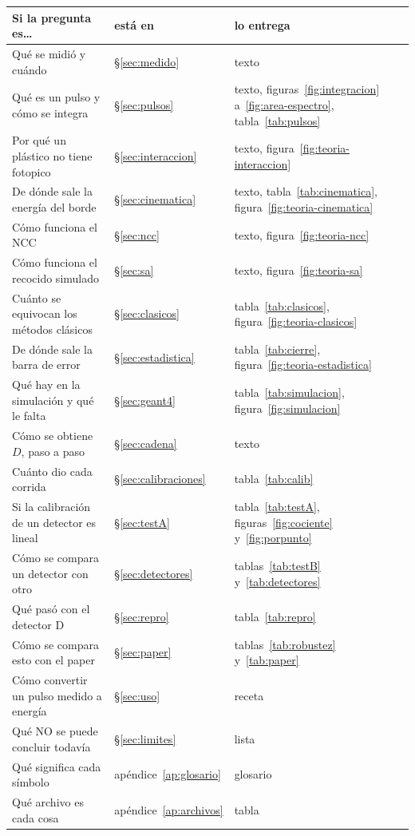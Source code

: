 \documentclass[11pt,a4paper]{article}
\begin{document}
\begin{center}
\begin{tabular}{lll}
\toprule
\textbf{Si la pregunta es\ldots} & \textbf{está en} & \textbf{lo entrega} \\
\midrule
Qué se midió y cuándo & \S\ref{sec:medido} & texto \\
Qué es un pulso y cómo se integra & \S\ref{sec:pulsos} &
   texto, figuras~\ref{fig:integracion} a~\ref{fig:area-espectro},
   tabla~\ref{tab:pulsos} \\
Por qué un plástico no tiene fotopico & \S\ref{sec:interaccion} &
   texto, figura~\ref{fig:teoria-interaccion} \\
De dónde sale la energía del borde & \S\ref{sec:cinematica} &
   texto, tabla~\ref{tab:cinematica}, figura~\ref{fig:teoria-cinematica} \\
Cómo funciona el NCC & \S\ref{sec:ncc} &
   texto, figura~\ref{fig:teoria-ncc} \\
Cómo funciona el recocido simulado & \S\ref{sec:sa} &
   texto, figura~\ref{fig:teoria-sa} \\
Cuánto se equivocan los métodos clásicos & \S\ref{sec:clasicos} &
   tabla~\ref{tab:clasicos}, figura~\ref{fig:teoria-clasicos} \\
De dónde sale la barra de error & \S\ref{sec:estadistica} &
   tabla~\ref{tab:cierre}, figura~\ref{fig:teoria-estadistica} \\
Qué hay en la simulación y qué le falta & \S\ref{sec:geant4} &
   tabla~\ref{tab:simulacion}, figura~\ref{fig:simulacion} \\
Cómo se obtiene $D$, paso a paso & \S\ref{sec:cadena} & texto \\
Cuánto dio cada corrida & \S\ref{sec:calibraciones} & tabla~\ref{tab:calib} \\
Si la calibración de un detector es lineal & \S\ref{sec:testA} &
   tabla~\ref{tab:testA}, figuras~\ref{fig:cociente} y~\ref{fig:porpunto} \\
Cómo se compara un detector con otro & \S\ref{sec:detectores} &
   tablas~\ref{tab:testB} y~\ref{tab:detectores} \\
Qué pasó con el detector D & \S\ref{sec:repro} &
   tabla~\ref{tab:repro} \\
Cómo se compara esto con el paper & \S\ref{sec:paper} &
   tablas~\ref{tab:robustez} y~\ref{tab:paper} \\
Cómo convertir un pulso medido a energía & \S\ref{sec:uso} & receta \\
Qué NO se puede concluir todavía & \S\ref{sec:limites} & lista \\
Qué significa cada símbolo & apéndice~\ref{ap:glosario} & glosario \\
Qué archivo es cada cosa & apéndice~\ref{ap:archivos} & tabla \\
\bottomrule
\end{tabular}
\end{center}
\end{document}
